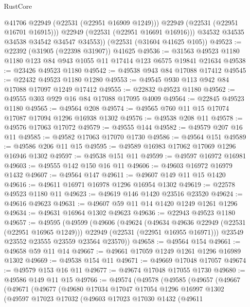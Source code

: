 \begin{lexlean}{RustCore}
\begin{coremodule}
              @41706
              @22949
              (@22531 (@22951 @16909 @1249)))
            @22949
            (@22531 (@22951 @16701 @16915)))
          @22949
          (@22531 (@22951 @16691 @16916)))
        @34532
        @34535
        @34538
        @34542
        @34547
        @34553))
    (@22531 (@31604 @41625 @105))
@49523 := @22392 (@31905 (@22398 @31907)) @41625
@49536 := @31563 @49523 @1180 @1180 @123 @84 @943 @1055 @11 @17414 @123 @6575 @19841 @21634
@49538 := @23426 @49523 @1180
@49542 := @49538 @943 @84 @17088 @17412
@49545 := @22432 @49523 @1180 @1280
@49553 := @49545 @930 @113 @942 @84 @17088 @17097 @1249 @17412
@49555 := @22832 @49523 @1180
@49562 := @49555 @303 @929 @16 @84 @17088 @17095 @4009
@49564 := @22845 @49523 @1180
@49565 := @49564 @208
@49574 := @49565 @760 @11 @15 @17074 @17087 @17094 @1296 @16938 @1302
@49576 := @49538 @208 @11
@49578 := @49576 @17063 @17072
@49579 := @49555 @144
@49582 := @49579 @207 @16 @11
@49585 := @49582 @17063 @17070 @1730
@49586 := @49564 @151
@49589 := @49586 @206 @11 @15
@49595 := @49589 @16983 @17062 @17069 @1296 @16946 @1302
@49597 := @49538 @151 @11
@49599 := @49597 @16972 @16981
@49603 := @49555 @142 @150 @16 @11
@49606 := @49603 @16972 @16979 @1432
@49607 := @49564 @147
@49611 := @49607 @149 @11 @15 @1420
@49616 := @49611 @16971 @16978 @1296 @16954 @1302
@49619 := @22578 @49523 @1180 @11
@49623 := @49619 @146 @1420 @23516 @23520
@49624 := @49616 @49623
@49631 := @49607 @59 @11 @14 @1420 @1249 @1261 @1296
@49634 := @49631 @16964 @1302 @49623
@49636 := @22943 @49523 @1180
@49657 := @49595
    (@49599
      (@49606
        (@49624
          (@49634 @49636 @22949 (@22531 (@22951 @16965 @1249)))
          @22949
          (@22531 (@22951 @16955 @16971)))
        @23549
        @23552
        @23555
        @23559
        @23564
        @23570))
@49658 := @49564 @154
@49661 := @49658 @59 @11 @14
@49667 := @49661 @17059 @1249 @1261 @1296 @16989 @1302
@49669 := @49538 @154 @11
@49671 := @49669 @17048 @17057
@49674 := @49579 @153 @16 @11
@49677 := @49674 @17048 @17055 @1730
@49680 := @49586 @149 @11 @15
@49766 := @49574
    (@49578
      (@49585
        (@49657
          (@49667
            (@49671
              (@49677
                (@49680
                  @17034
                  @17047
                  @17054
                  @1296
                  @16997
                  @1302
                  (@49597
                    @17023
                    @17032
                    (@49603
                      @17023
                      @17030
                      @1432
                      (@49611

\end{coremodule}
\end{lexlean}
